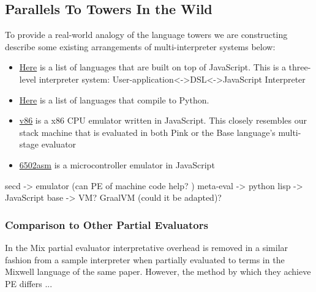 \documentclass[fleqn]{article}
\theoremstyle{definition}
\begin{document}
\subsection{Parallels To Towers In the Wild}
To provide a real-world analogy of the language towers we are constructing describe some existing arrangements of multi-interpreter systems below:
\begin{itemize}
	\item \href{https://github.com/jashkenas/coffeescript/wiki/List-of-languages-that-compile-to-JS}{Here} is a list of languages that are built on top of JavaScript. This is a three-level interpreter system: User-application<->DSL<->JavaScript Interpreter
	\item \href{https://github.com/vindarel/languages-that-compile-to-python#other-languages-that-target-the-python-platform}{Here} is a list of languages that compile to Python.
	\item \href{https://github.com/copy/v86}{v86} is a x86 CPU emulator written in JavaScript. This closely resembles our stack machine that is evaluated in both Pink or the Base language's multi-stage evaluator
	\item \href{http://6502asm.com/}{6502asm} is a microcontroller emulator in JavaScript
\end{itemize}
secd -> emulator (can PE of machine code help? \cite{srinivasan2015partial})
meta-eval -> python
lisp -> JavaScript
base -> VM? GraalVM (could it be adapted)?

\subsubsection{Comparison to Other Partial Evaluators}
In the Mix partial evaluator \cite{jones1989mix} interpretative overhead is removed in a similar fashion from a sample interpreter when partially evaluated to terms in the Mixwell language of the same paper. However, the method by which they achieve PE differs ...
\end{document}
